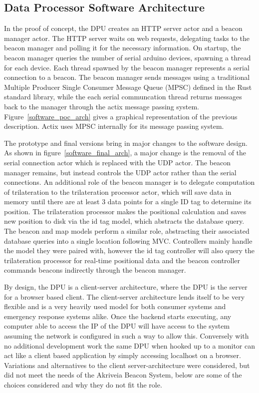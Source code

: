 \subsection{Data Processor Software Architecture}
\medskip
In the proof of concept, the DPU creates an HTTP server actor and a beacon manager actor.
The HTTP server waits on web requests, delegating tasks to the beacon manager and polling it for the necessary information.
On startup, the beacon manager queries the number of serial arduino devices, spawning a thread for each device.
Each thread spawned by the beacon manager represents a serial connection to a beacon.
The beacon manager sends messages using a traditional Multiple Producer Single Consumer Message Queue (\Gls{MPSC}) defined in the Rust standard library, while the each serial communcation thread returns messages back to the manager through the actix message passing system.
Figure~\ref{software_poc_arch} gives a graphical representation of the previous description. Actix uses MPSC internally for its message passing system.

\bigskip
The prototype and final versions bring in major changes to the software design.
As shown in figure~\ref{software_final_arch}, a major change is the removal of the serial connection actor which is replaced with the UDP actor.
The beacon manager remains, but instead controls the UDP actor rather than the serial connections.
An additional role of the beacon manager is to delegate computation of trilateration to the trilateration processor actor, which will save data in memory until there are at least 3 data points for a single ID tag to determine its position.
The trilateration processor makes the positional calculation and saves new position to disk via the id tag model, which abstracts the database query.
The beacon and map models perform a similar role, abstracting their associated database queries into a single location following \Gls{MVC}.
Controllers mainly handle the model they were paired with, however the id tag controller will also query the trilateration processor for real-time positional data and the beacon controller commands beacons indirectly through the beacon manager.

\bigskip
By design, the DPU is a client-server architecture, where the DPU is the server for a browser based client.
The client-server architecture lends itself to be very flexible and is a very heavily used model for both consumer systems and emergency response systems alike.
Once the backend starts executing, any computer able to access the IP of the DPU will have access to the system assuming the network is configured in such a way to allow this. Conversely with no additional development work the same DPU when hooked up to a monitor can act like a client based application by simply accessing localhost on a browser. Variations and alternatives to the client server-architecture were considered, but did not meet the needs of the Akriveia Beacon System, below are some of the choices considered and why they do not fit the role.

